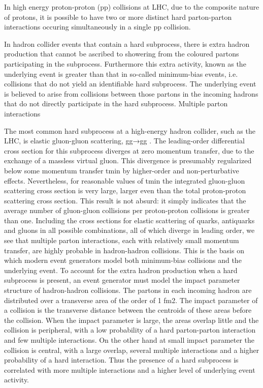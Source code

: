 In high energy proton-proton (pp) collisions at LHC, due to the composite nature of
protons, it is possible to have two or more distinct hard parton-parton interactions
occuring simultaneously in a single pp collision.

In hadron collider events that contain a hard subprocess, there is extra hadron production that cannot be ascribed to showering from the coloured partons participating in the subprocess. Furthermore this extra activity, known as the underlying event is greater than that in so-called minimum-bias events, i.e. collisions that do not yield an identifiable hard subprocess. The underlying event is believed to arise from collisions between those partons in the incoming hadrons that do not directly participate in the hard subprocess.
Multiple parton interactions

The most common hard subprocess at a high-energy hadron collider, such as the LHC, is elastic gluon-gluon scattering, gg→gg . The leading-order differential cross section for this subprocess diverges at zero momentum transfer, due to the exchange of a massless virtual gluon. This divergence is presumably regularized below some momentum transfer tmin by higher-order and non-perturbative effects. Nevertheless, for reasonable values of tmin the integrated gluon-gluon scattering cross section is very large, larger even than the total proton-proton scattering cross section. This result is not absurd: it simply indicates that the average number of gluon-gluon collisions per proton-proton collisions is greater than one. Including the cross sections for elastic scattering of quarks, antiquarks and gluons in all possible combinations, all of which diverge in leading order, we see that multiple parton interactions, each with relatively small momentum transfer, are highly probable in hadron-hadron collisions. This is the basis on which modern event generators model both minimum-bias collisions and the underlying event. To account for the extra hadron production when a hard subprocess is present, an event generator must model the impact parameter structure of hadron-hadron collisions. The partons in each incoming hadron are distributed over a transverse area of the order of 1 fm2. The impact parameter of a collision is the transverse distance between the centroids of these areas before the collision. When the impact parameter is large, the areas overlap little and the collision is peripheral, with a low probability of a hard parton-parton interaction and few multiple interactions. On the other hand at small impact parameter the collision is central, with a large overlap, several multiple interactions and a higher probability of a hard interaction. Thus the presence of a hard subprocess is correlated with more multiple interactions and a higher level of underlying event activity. 




